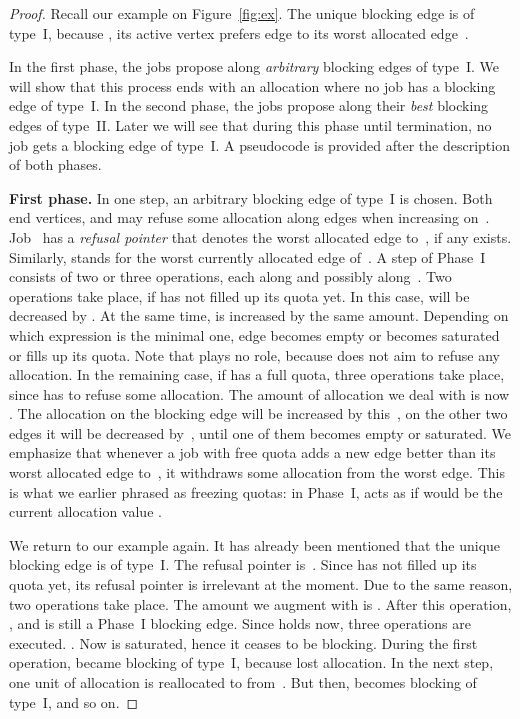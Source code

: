 \documentclass{llncs}
\begin{document}
\begin{proof}

Recall our example on Figure~\ref{fig:ex}. The unique blocking edge  is of type~I, because , its active vertex prefers edge  to its worst allocated edge~.

In the first phase, the jobs propose along \textit{arbitrary} blocking edges of type~I. We will show that this process ends with an allocation where no job has a blocking edge of type~I. In the second phase, the jobs propose along their \textit{best} blocking edges of type~II. Later we will see that during this phase until termination, no job gets a blocking edge of type~I. A pseudocode is provided after the description of both phases.

\textbf{First phase. }
In one step, an arbitrary blocking edge  of type~I is chosen. Both end vertices,  and  may refuse some allocation along edges when increasing  on~. Job~ has a \emph{refusal pointer}  that denotes the worst allocated edge to~, if any exists. Similarly,  stands for the worst currently allocated edge of~. A step of Phase~I consists of two or three operations, each along  and possibly along~. Two operations take place, if  has not filled up its quota yet. In this case,  will be decreased by . At the same time,  is increased by the same amount. Depending on which expression is the minimal one, edge  becomes empty or  becomes saturated or  fills up its quota. Note that  plays no role, because  does not aim to refuse any allocation. In the remaining case, if  has a full quota, three operations take place, since  has to refuse some allocation. The amount of allocation we deal with is now . The allocation on the blocking edge  will be increased by this~, on the other two edges it will be decreased by~, until one of them becomes empty or saturated. We emphasize that whenever a job  with free quota adds a new edge better than its worst allocated edge to~, it withdraws some allocation from the worst edge. This is what we earlier phrased as freezing quotas: in Phase~I,  acts as if  would be the current allocation value .

We return to our example again. It has already been mentioned that the unique blocking edge  is of type~I. The refusal pointer  is~. Since  has not filled up its quota yet, its refusal pointer  is irrelevant at the moment. Due to the same reason, two operations take place. The amount we augment with is . After this operation, , and  is still a Phase~I blocking edge. Since  holds now, three operations are executed. . Now  is saturated, hence it ceases to be blocking. During the first operation,  became blocking of type~I, because  lost allocation. In the next step, one unit of allocation is reallocated to  from~. But then,  becomes blocking of type~I, and so on.


\end{proof}
\end{document}
